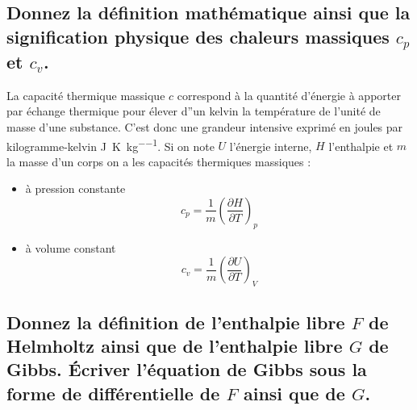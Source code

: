 \subsection{Donnez la définition mathématique ainsi que la signification physique des chaleurs massiques $c_p$ et $c_v$.}
La capacité thermique massique $c$ correspond à la quantité d'énergie à apporter par échange thermique pour élever d''un kelvin la température de l'unité de masse d'une substance. C'est donc une grandeur intensive exprimé en joules par kilogramme-kelvin \si{\joule\per\kelvin\per\kilo\gram}. Si on note $U$ l'énergie interne, $H$ l'enthalpie et $m$ la masse d'un corps on a les capacités thermiques massiques :
\begin{itemize}
	\item à pression constante \begin{equation} c_p = \frac{1}{m}\left(\frac{\partial H}{\partial T}\right)_p \end{equation}
	\item à volume constant \begin{equation} c_v = \frac{1}{m}\left(\frac{\partial U}{\partial T}\right)_V \end{equation}
\end{itemize}

\subsection{Donnez la définition de l'enthalpie libre $F$ de Helmholtz ainsi que de l'enthalpie libre $G$ de Gibbs. Écriver l'équation de Gibbs sous la forme de différentielle de $F$ ainsi que de $G$.}
